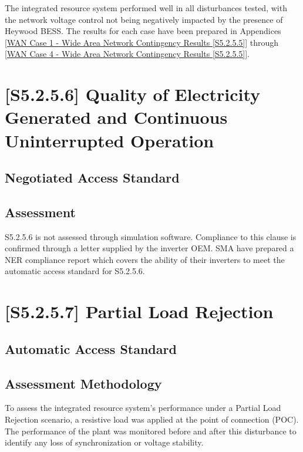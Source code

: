 \documentclass{../grid-link-report}
\newcommand{\projectassetsdir}{../project-assets}
\begin{document}
	The integrated resource system performed well in all disturbances tested, with the network voltage control not being negatively impacted by the presence of Heywood BESS. The results for each case have been prepared in Appendices \ref{WAN Case 1 - Wide Area Network Contingency Results [S5.2.5.5]} through \ref{WAN Case 4 - Wide Area Network Contingency Results [S5.2.5.5]}.
	
	
	\section{[S5.2.5.6] Quality of Electricity Generated and Continuous Uninterrupted Operation}
	\subsection{Negotiated Access Standard}
	\begin{tcolorbox}[lightgreenbox]
		
	\end{tcolorbox}
	\subsection{Assessment}
	
	
	
	
	S5.2.5.6 is not assessed through simulation software. Compliance to this clause is confirmed through a letter supplied by the inverter OEM. SMA have prepared a NER compliance report which covers the ability of their inverters to meet the automatic access standard for S5.2.5.6. \cite{SMA-NER-compliance-report}
	
	\section{[S5.2.5.7] Partial Load Rejection}
	\subsection{Automatic Access Standard}
	\begin{tcolorbox}[lightgreenbox]
		
	\end{tcolorbox}
	\subsection{Assessment Methodology}
	
	To assess the integrated resource system's performance under a Partial Load Rejection scenario, a resistive load  was applied at the point of connection (POC). The performance of the plant was monitored before and after this disturbance to identify any loss of synchronization or voltage stability.
	
\end{document}
